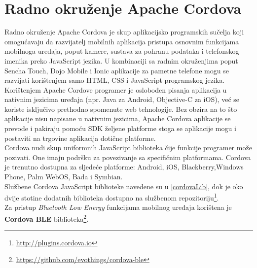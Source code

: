 \chapter{Radno okruženje Apache Cordova}

Radno okruženje Apache Cordova je skup aplikacijsko programskih sučelja  koji omogućavaju da razvijatelj mobilnih aplikacija pristupa osnovnim funkcijama mobilnoga uređaja, poput kamere, sustava za pohranu podataka i telefonskog imenika preko JavaScript jezika. 
U kombinaciji sa radnim okruženjima poput Sencha Touch, Dojo Mobile i Ionic aplikacije za pametne telefone mogu se razvijati korištenjem samo HTML, CSS i JavaScript programskog jezika.
\\

Korištenjem Apache Cordove programer je oslobođen pisanja aplikacija u nativnim jezicima uređaja (npr. Java za Android, Objective-C za iOS), već se koriste isključivo prethodno spomenute web tehnologije. 
Bez obzira na to što aplikacije nisu napisane u nativnim jezicima, Apache Cordova aplikacije se prevode i pakiraju pomoću SDK  željene platforme stoga se aplikacije mogu i postaviti na trgovine aplikacija  dotične platforme. 
\\

Cordova nudi skup uniformnih JavaScript biblioteka čije funkcije programer može pozivati. 
One imaju podršku za povezivanje sa specifičnim platformama. Cordova je trenutno dostupna za sljedeće platforme: Android, iOS, Blackberry,Windows Phone, Palm WebOS, Bada i Symbian.
\\
Službene Cordova JavaScript biblioteke navedene su u \ref{cordovaLib}, dok je oko dvije stotine dodatnih biblioteka dostupno na službenom repozitoriju\footnote{\url{http://plugins.cordova.io}}. %
\\
Za pristup \textit{Bluetooth Low Energy} funkcijama mobilnog uređaja korištena je \textbf{Cordova BLE} biblioteka\footnote{\url{https://github.com/evothings/cordova-ble}}.
\\

